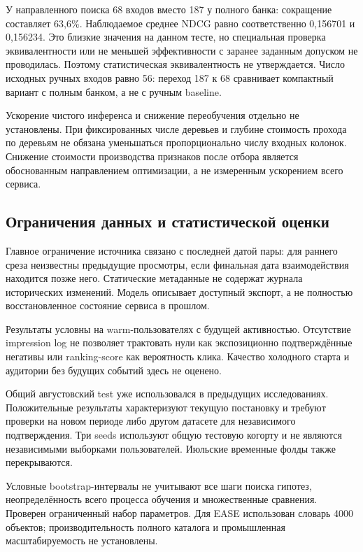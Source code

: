 \documentclass[12pt,a4paper]{article}
\begin{document}
У направленного поиска 68 входов вместо 187 у полного банка: сокращение
составляет 63,6\%. Наблюдаемое среднее NDCG равно соответственно
0,156701 и 0,156234. Это близкие значения на данном тесте, но специальная
проверка эквивалентности или не меньшей эффективности с заранее заданным
допуском не проводилась. Поэтому статистическая эквивалентность не утверждается.
Число исходных ручных входов равно 56: переход 187 к 68 сравнивает
компактный вариант с полным банком, а не с ручным baseline.

Ускорение чистого инференса и снижение переобучения отдельно не установлены.
При фиксированных числе деревьев и глубине стоимость прохода по деревьям
не обязана уменьшаться пропорционально числу входных колонок.
Снижение стоимости производства признаков после отбора является
обоснованным направлением оптимизации, а не измеренным ускорением всего сервиса.

\subsection{Ограничения данных и статистической оценки}
Главное ограничение источника связано с последней датой пары:
для раннего среза неизвестны предыдущие просмотры, если финальная дата
взаимодействия находится позже него. Статические метаданные не содержат
журнала исторических изменений. Модель описывает доступный экспорт,
а не полностью восстановленное состояние сервиса в прошлом.

Результаты условны на warm-пользователях с будущей активностью.
Отсутствие impression log не позволяет трактовать нули как
экспозиционно подтверждённые негативы или ranking-score как вероятность клика.
Качество холодного старта и аудитории без будущих событий здесь не оценено.

Общий августовский test уже использовался в предыдущих исследованиях.
Положительные результаты характеризуют текущую постановку и требуют
проверки на новом периоде либо другом датасете для независимого подтверждения.
Три seeds используют общую тестовую когорту и не являются независимыми
выборками пользователей. Июльские временные фолды также перекрываются.

Условные bootstrap-интервалы не учитывают все шаги поиска гипотез,
неопределённость всего процесса обучения и множественные сравнения.
Проверен ограниченный набор параметров. Для EASE использован словарь
4000 объектов; производительность полного каталога и промышленная
масштабируемость не установлены.
\end{document}
